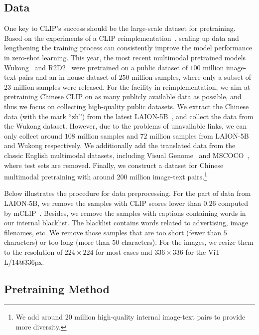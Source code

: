 \subsection{Data}
One key to CLIP's success should be the large-scale dataset for pretraining. 
Based on the experiments of a CLIP reimplementation~\citep{openclip}, scaling up data and lengthening the training process can consistently improve the model performance in zero-shot learning. 
This year, the most recent multimodal pretrained models Wukong~\citep{wukong} and R2D2~\citep{r2d2} were pretrained on a public dataset of $100$ million image-text pairs and an in-house dataset of $250$ million samples, where only a subset of $23$ million samples were released. 
For the facility in reimplementation, we aim at pretraining Chinese CLIP on as many publicly available data as possible, and thus we focus on collecting high-quality public datasets. 
We extract the Chinese data (with the mark ``zh'') from the latest LAION-5B~\cite{schuhmann2021laion}, and collect the data from the Wukong dataset. 
However, due to the problems of unavailable links, we can only collect around $108$ million samples and $72$ million samples from LAION-5B and Wukong respectively. 
We additionally add the translated data from the classic English multimodal datasets, including Visual Genome~\cite{vg} and MSCOCO~\citep{coco_cap}, where test sets are removed. 
Finally, we construct a dataset for Chinese multimodal pretraining with around $200$ million image-text pairs.\footnote{We add around $20$ million high-quality internal image-text pairs to provide more diversity. } 

Below illustrates the procedure for data preprocessing. 
For the part of data from LAION-5B, we remove the samples with CLIP scores lower than $0.26$ computed by mCLIP~\citep{mclip}. 
Besides, we remove the samples with captions containing words in our internal blacklist. 
The blacklist contains words related to advertising, image filenames, etc. 
We remove those samples that are too short (fewer than $5$ characters) or too long (more than $50$ characters). 
For the images, we resize them to the resolution of $224 \times 224$ for most cases and $336 \times 336$ for the ViT-L/14@336px. 

\subsection{Pretraining Method}
\label{subsec:pretraining_method}

